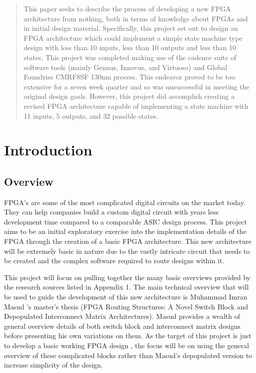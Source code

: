 \documentclass[12pt]{article}
\begin{document}
\begin{abstract}
This paper seeks to describe the process of developing a new FPGA architecture from 
nothing, both in terms of knowledge about FPGAs and in initial design material. Specifically,
 this project set out to design an FPGA architecture which could implement a simple 
state machine type design with less than 10 inputs, less than 10 outputs and less 
than 10 states. This project was completed making use of the cadence suite of software 
tools (mainly Gennus, Innovus, and Virtuoso) and Global Foundries CMRF8SF 130nm process.
 This endeavor proved to be too extensive for a seven week quarter and so was unsuccessful 
in meeting the original design goals. However, this project did accomplish creating 
a revised FPGA architecture capable of implementing a state machine with 11 inputs,
 5 outputs, and 32 possible states.
\end{abstract}
\newpage

\tableofcontents
\newpage
\listoffigures
\newpage

\section{Introduction}

\subsection{Overview}

FPGA’s are some of the most complicated digital circuits on the market today. They 
can help companies build a custom digital circuit with years less development time 
compared to a comparable ASIC design process. This project aims to be an initial 
exploratory exercise into the implementation details of the FPGA through the creation 
of a basic FPGA architecture. This new architecture will be extremely basic in nature 
due to the vastly intricate circuit that needs to be created and the complex software 
required to route designs within it.

This project will focus on pulling together the many basic overviews provided by 
the research sources listed in Appendix 1. The main technical overview that will 
be used to guide the development of this new architecture is Muhammad Imran Masud
’s master's thesis (FPGA Routing Structures: A Novel Switch Block and Depopulated 
Interconnect Matrix Architectures). Masud provides a wealth of general overview details 
of both switch block and interconnect matrix designs before presenting his own variations 
on them. As the target of this project is just to develop a basic working FPGA design
, the focus will be on using the general overview of these complicated blocks rather 
than Masud’s depopulated version to increase simplicity of the design.
\end{document}

